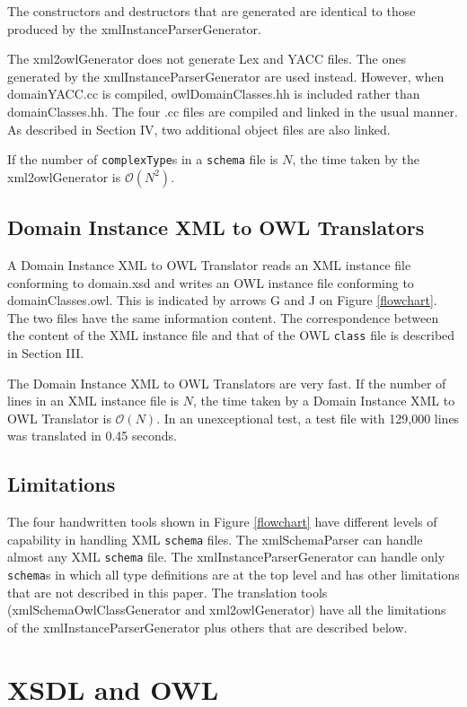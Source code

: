 \documentclass[preprint,12pt]{elsarticle}
\begin{document}
The constructors and destructors that are generated are identical to those
produced by the xmlInstanceParserGenerator.

The xml2owlGenerator does not generate Lex and YACC files. The ones
generated by the xmlInstanceParserGenerator are used instead. However, when
domainYACC.cc is compiled, owlDomainClasses.hh is included rather than
domainClasses.hh. The four .cc files are compiled and linked in the usual
manner. As described in Section IV, two additional object files are also
linked.

If the number of {\tt complexType}s in a {\tt schema} file is ${N}$, the
time taken by the xml2owlGenerator is $\mathcal{O}{(N^2)}$.

\subsection{Domain Instance XML to OWL Translators}
A Domain Instance XML to OWL Translator reads an XML instance file
conforming to domain.xsd and writes an OWL instance file conforming to
domainClasses.owl. This is indicated by arrows G and J on Figure
\ref{flowchart}. The two files have the same information content. The
correspondence between the content of the XML instance file and that of the
OWL {\tt class} file is described in Section III.

The Domain Instance XML to OWL Translators are very fast. If the number of
lines in an XML instance file is ${N}$, the time taken by a Domain Instance
XML to OWL Translator is $\mathcal{O}{(N)}$. In an unexceptional test, a
test file with 129,000 lines was translated in 0.45 seconds.

\subsection{Limitations}
The four handwritten tools shown in Figure \ref{flowchart} have different
levels of capability in handling XML {\tt schema} files. The
xmlSchemaParser can handle almost any XML {\tt schema} file. The
xmlInstanceParserGenerator can handle only {\tt schema}s in which all type
definitions are at the top level and has other limitations that are not
described in this paper. The translation tools (xmlSchemaOwlClassGenerator
and xml2owlGenerator) have all the limitations of the
xmlInstanceParserGenerator plus others that are described below.

\section{XSDL and OWL}
\label{xsdlAndOWL}
\end{document}
